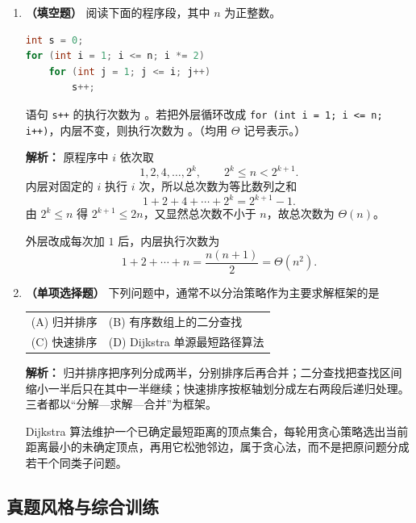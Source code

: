\begin{enumerate}
\item \textbf{（填空题）} 阅读下面的程序段，其中 $n$ 为正整数。
\begin{lstlisting}[language=C]
int s = 0;
for (int i = 1; i <= n; i *= 2)
    for (int j = 1; j <= i; j++)
        s++;
\end{lstlisting}
语句 \texttt{s++} 的执行次数为 \underline{\qquad\qquad}。若把外层循环改成 \texttt{for (int i = 1; i <= n; i++)}，内层不变，则执行次数为 \underline{\qquad\qquad}。（均用 $\Theta$ 记号表示。）

\ifshowsolutions\par\noindent\textbf{解析：} 原程序中 $i$ 依次取
\[
1,2,4,\ldots,2^k,\qquad 2^k\le n<2^{k+1}.
\]
内层对固定的 $i$ 执行 $i$ 次，所以总次数为等比数列之和
\[
1+2+4+\cdots+2^k=2^{k+1}-1.
\]
由 $2^k\le n$ 得 $2^{k+1}\le 2n$，又显然总次数不小于 $n$，故总次数为 $\Theta(n)$。

外层改成每次加 $1$ 后，内层执行次数为
\[
1+2+\cdots+n=\frac{n(n+1)}{2}=\Theta(n^2).
\]
\else \answerarea \fi

\item \textbf{（单项选择题）} 下列问题中，通常不以分治策略作为主要求解框架的是
\begin{center}
\begin{tabular}{ll}
(A) 归并排序 & (B) 有序数组上的二分查找 \\[4pt]
(C) 快速排序 & (D) Dijkstra 单源最短路径算法
\end{tabular}
\end{center}

\ifshowsolutions\par\noindent\textbf{解析：} 归并排序把序列分成两半，分别排序后再合并；二分查找把查找区间缩小一半后只在其中一半继续；快速排序按枢轴划分成左右两段后递归处理。三者都以“分解—求解—合并”为框架。

Dijkstra 算法维护一个已确定最短距离的顶点集合，每轮用贪心策略选出当前距离最小的未确定顶点，再用它松弛邻边，属于贪心法，而不是把原问题分成若干个同类子问题。\else \answerarea \fi

\end{enumerate}

\subsection{真题风格与综合训练}


